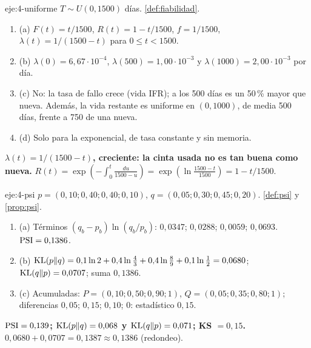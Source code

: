 \begin{solucion}{eje:4-uniforme}
\datos $T\sim U(0,1500)$ días.
\planteamiento \cref{def:fiabilidad}.
\pasos
\begin{enumerate}[label=\arabic*.]
  \item (a) $F(t)=t/1500$, $R(t)=1-t/1500$, $f=1/1500$, $\lambda(t)=1/(1500-t)$ para $0\le t<1500$.
  \item (b) $\lambda(0)=6{,}67\cdot10^{-4}$, $\lambda(500)=1{,}00\cdot10^{-3}$ y $\lambda(1000)=2{,}00\cdot10^{-3}$ por día.
  \item (c) No: la tasa de fallo crece (vida IFR); a los 500 días es un 50\,\% mayor que nueva. Además, la vida restante es uniforme en $(0,1000)$, de media 500 días, frente a 750 de una nueva.
  \item (d) Solo para la exponencial, de tasa constante y sin memoria.
\end{enumerate}
\resultado \textbf{$\lambda(t)=1/(1500-t)$, creciente: la cinta usada no es tan buena como nueva.}
\comprobacion $R(t)=\exp(-\int_0^t\frac{du}{1500-u})=\exp(\ln\frac{1500-t}{1500})=1-t/1500$.
\end{solucion}

\begin{solucion}{eje:4-psi}
\datos $p=(0{,}10;0{,}40;0{,}40;0{,}10)$, $q=(0{,}05;0{,}30;0{,}45;0{,}20)$.
\planteamiento \cref{def:psi} y \cref{prop:psi}.
\pasos
\begin{enumerate}[label=\arabic*.]
  \item (a) Términos $(q_b-p_b)\ln(q_b/p_b)$: $0{,}0347$; $0{,}0288$; $0{,}0059$; $0{,}0693$. $\operatorname{PSI}=0{,}1386$.
  \item (b) $\operatorname{KL}(p\|q)=0{,}1\ln2+0{,}4\ln\frac43+0{,}4\ln\frac89+0{,}1\ln\frac12=0{,}0680$; $\operatorname{KL}(q\|p)=0{,}0707$; suma $0{,}1386$.
  \item (c) Acumuladas: $P=(0{,}10;0{,}50;0{,}90;1)$, $Q=(0{,}05;0{,}35;0{,}80;1)$; diferencias $0{,}05$; $0{,}15$; $0{,}10$; $0$: estadístico $0{,}15$.
\end{enumerate}
\resultado \textbf{$\operatorname{PSI}=0{,}139$; $\operatorname{KL}(p\|q)=0{,}068$ y $\operatorname{KL}(q\|p)=0{,}071$; KS $=0{,}15$.}
\comprobacion $0{,}0680+0{,}0707=0{,}1387\approx0{,}1386$ (redondeo).
\end{solucion}


